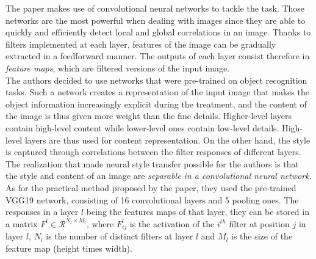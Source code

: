 \documentclass[twocolumn,superscriptaddress,aps, floatfix]{revtex4-1}
\begin{document}
    The paper \cite{DBLP:journals/corr/GatysEB15a} makes use of convolutional neural networks to tackle the task. Those networks are the most powerful when dealing with images since they are able to quickly and efficiently detect local and global correlations in an image. Thanks to filters implemented at each layer, features of the image can be gradually extracted in a feedforward manner. The outputs of each layer consist therefore in \emph{feature maps}, which are filtered versions of the input image.\\
    
    The authors decided to use networks that were pre-trained on object recognition tasks. Such a network creates a representation of the input image that makes the object information increasingly explicit during the treatment, and the content of the image is thus given more weight than the fine details. Higher-level layers contain high-level content while lower-level ones contain low-level details. High-level layers are thus used for content representation. On the other hand, the style is captured through correlations between the filter responses of different layers.\\
    
    The realization that made neural style transfer possible for the authors is that the style and content of an image are \emph{separable in a convolutional neural network}.\\
    
    As for the practical method proposed by the paper, they used the pre-trained VGG19 network, consisting of 16 convolutional layers and 5 pooling ones. The responses in a layer $l$ being the features maps of that layer, they can be stored in a matrix $F^l \in \mathcal{R}^{N_l\times M_l}$, where $F_{ij}^l$ is the activation of the $i^{th}$ filter at position $j$ in layer $l$, $N_l$ is the number of distinct filters at layer $l$ and $M_l$ is the size of the feature map (height times width).\\ 
    
\end{document}
